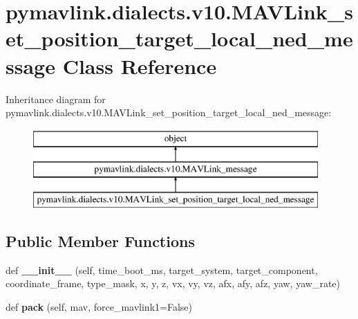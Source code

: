 \hypertarget{classpymavlink_1_1dialects_1_1v10_1_1MAVLink__set__position__target__local__ned__message}{}\section{pymavlink.\+dialects.\+v10.\+M\+A\+V\+Link\+\_\+set\+\_\+position\+\_\+target\+\_\+local\+\_\+ned\+\_\+message Class Reference}
\label{classpymavlink_1_1dialects_1_1v10_1_1MAVLink__set__position__target__local__ned__message}
Inheritance diagram for pymavlink.\+dialects.\+v10.\+M\+A\+V\+Link\+\_\+set\+\_\+position\+\_\+target\+\_\+local\+\_\+ned\+\_\+message\+:\begin{figure}[H]
\begin{center}
\leavevmode
\includegraphics[height=3.000000cm]{classpymavlink_1_1dialects_1_1v10_1_1MAVLink__set__position__target__local__ned__message}
\end{center}
\end{figure}
\subsection*{Public Member Functions}
\begin{DoxyCompactItemize}
\item 
\mbox{\label{classpymavlink_1_1dialects_1_1v10_1_1MAVLink__set__position__target__local__ned__message_ab054fed02b56432cffce8955bf1d6bd6}} 
def {\bfseries \+\_\+\+\_\+init\+\_\+\+\_\+} (self, time\+\_\+boot\+\_\+ms, target\+\_\+system, target\+\_\+component, coordinate\+\_\+frame, type\+\_\+mask, x, y, z, vx, vy, vz, afx, afy, afz, yaw, yaw\+\_\+rate)
\item 
\mbox{\label{classpymavlink_1_1dialects_1_1v10_1_1MAVLink__set__position__target__local__ned__message_a3a3e91a910cb8554452e9dd8805ac3db}} 
def {\bfseries pack} (self, mav, force\+\_\+mavlink1=False)
\end{DoxyCompactItemize}
